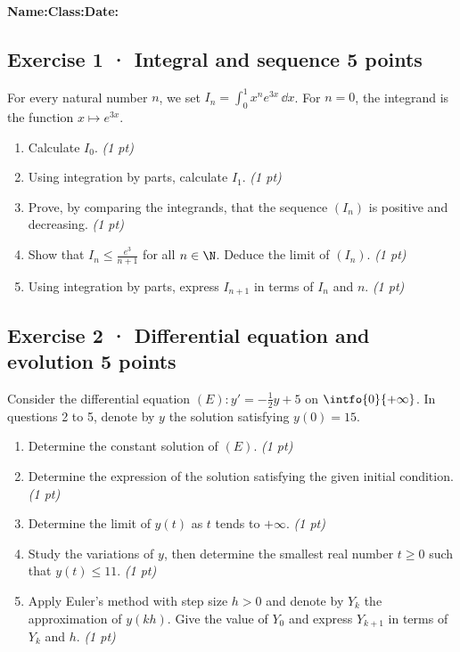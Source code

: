 \smallskip\textbf{Name:}\enspace\dotfill\quad\textbf{Class:}\enspace\dotfill\quad\textbf{Date:}\enspace\dotfill

\subsection*{Exercise 1 · Integral and sequence \hfill 5 points}For every natural number $n$, we set $I_n=\displaystyle\int_0^1x^ne^{3x}\,\dd x$. For $n=0$, the integrand is the function $x\mapsto e^{3x}$.

\begin{enumerate}

\item Calculate $I_0$. \hfill\textit{(1 pt)}

\item Using integration by parts, calculate $I_1$. \hfill\textit{(1 pt)}

\item Prove, by comparing the integrands, that the sequence $(I_n)$ is positive and decreasing. \hfill\textit{(1 pt)}

\item Show that $I_n\le\frac{e^{3}}{n+1}$ for all $n\in\N$. Deduce the limit of $(I_n)$. \hfill\textit{(1 pt)}

\item Using integration by parts, express $I_{n+1}$ in terms of $I_n$ and $n$. \hfill\textit{(1 pt)}

\end{enumerate}

\subsection*{Exercise 2 · Differential equation and evolution \hfill 5 points}Consider the differential equation $(E):y'=-\frac1{2}y+5$ on $\intfo{0}{+\infty}$. In questions 2 to 5, denote by $y$ the solution satisfying $y(0)=15$.

\begin{enumerate}

\item Determine the constant solution of $(E)$. \hfill\textit{(1 pt)}

\item Determine the expression of the solution satisfying the given initial condition. \hfill\textit{(1 pt)}

\item Determine the limit of $y(t)$ as $t$ tends to $+\infty$. \hfill\textit{(1 pt)}

\item Study the variations of $y$, then determine the smallest real number $t\ge0$ such that $y(t)\le11$. \hfill\textit{(1 pt)}

\item Apply Euler's method with step size $h>0$ and denote by $Y_k$ the approximation of $y(kh)$. Give the value of $Y_0$ and express $Y_{k+1}$ in terms of $Y_k$ and $h$. \hfill\textit{(1 pt)}

\end{enumerate}

